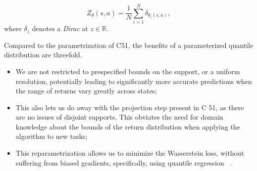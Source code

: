 \begin{equation}
	\label{eq:quantile_distribution}
	Z_\theta(s,a)= \frac{1}{N} \sum_{i=1}^{N} \delta_{\theta_i(s,a)},
\end{equation} 
where $\delta_z$ denotes a \emph{Dirac} at $z \in \mathbb{R}$.\par
Compared to the parametrization of C51, the benefits of a parameterized quantile distribution are threefold. 
\begin{itemize}
\item We are not restricted to prespecified bounds on the support, or a uniform resolution, potentially leading to significantly more accurate predictions when the range of returns vary greatly across states;
\item This also lets us do away with the projection step present in C 51, as there are no issues of disjoint supports. This obviates the need for domain knowledge about the bounds of the return distribution when applying the algorithm to new tasks;
\item This reparametrization allows us to minimize the Wasserstein loss, without suffering from biased gradients, specifically, using quantile regression ~\cite{DBLP:journals/corr/abs-1710-10044}.
\end{itemize}
